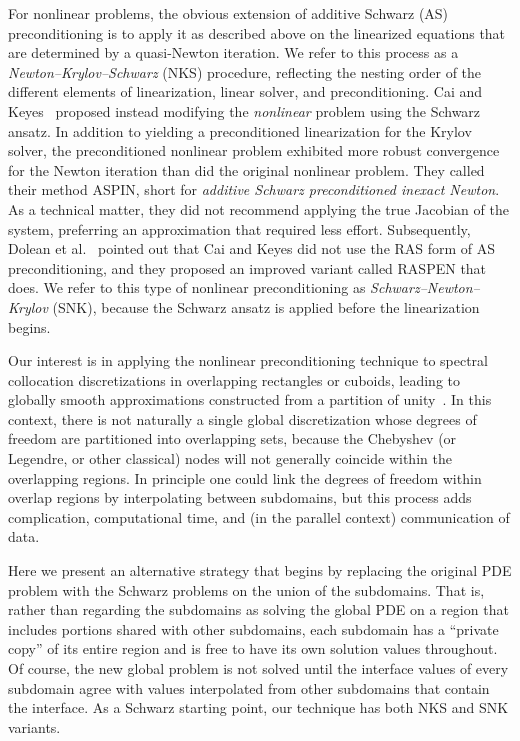 For nonlinear problems, the obvious extension of  additive Schwarz (AS) preconditioning is to apply it as described above on the linearized equations that are determined by a quasi-Newton iteration. We refer to this process as a \emph{Newton--Krylov--Schwarz} (NKS) procedure, reflecting the nesting order of the different elements of linearization, linear solver, and preconditioning. Cai and Keyes~\cite{Cai2002} proposed instead modifying the \emph{nonlinear} problem using the Schwarz ansatz. In addition to yielding a preconditioned linearization for the Krylov solver, the preconditioned nonlinear problem exhibited more robust convergence for the Newton iteration than did the original nonlinear problem. They called their method ASPIN, short for \textit{additive Schwarz preconditioned inexact Newton}. As a technical matter, they did not recommend applying the true Jacobian of the system, preferring an approximation that required less effort. Subsequently, Dolean et al.~\cite{Dolean2016} pointed out that Cai and Keyes did not use the RAS form of AS preconditioning, and they proposed an improved variant called RASPEN that does. We refer to this type of nonlinear preconditioning as \emph{Schwarz--Newton--Krylov} (SNK), because the Schwarz ansatz is applied before the linearization begins.

Our interest is in applying the nonlinear preconditioning technique to spectral collocation discretizations in overlapping rectangles or cuboids, leading to globally smooth approximations constructed from a partition of unity~\cite{AitonTA}. In this context, there is not naturally a single global discretization whose degrees of freedom are partitioned into overlapping sets, because the Chebyshev (or Legendre, or other classical) nodes will not generally coincide within the overlapping regions. In principle one could link the degrees of freedom within overlap regions by interpolating between subdomains, but this process adds complication, computational time, and (in the parallel context) communication of data.

Here we present an alternative strategy that begins by replacing the original PDE problem with the Schwarz problems on the union of the subdomains. That is, rather than regarding the subdomains as solving the global PDE on a region that includes portions shared with other subdomains, each subdomain has a ``private copy'' of its entire region and is free to have its own solution values throughout. Of course, the new global problem is not solved until the interface values of every subdomain agree with values interpolated from other subdomains that contain the interface. As a Schwarz starting point, our technique has both NKS and SNK variants. 

